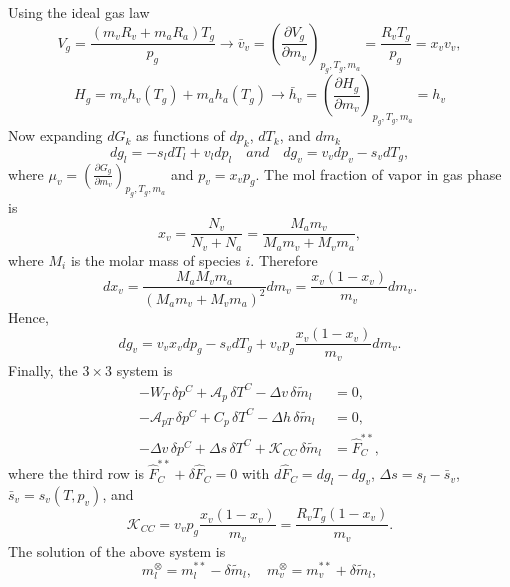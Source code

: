 Using the ideal gas law
\begin{equation}
V_g = \frac{(m_vR_v+m_aR_a)T_g}{p_g} \rightarrow \bar{v}_v = \left( \frac{\partial V_g}{\partial m_v} \right)_{p_g,T_g,m_a} = \frac{R_vT_g}{p_g} = x_v v_v,
\end{equation}
\begin{equation}
H_g = m_v h_v(T_g) + m_a h_a(T_g) \rightarrow \bar{h}_v = \left( \frac{\partial H_g}{\partial m_v} \right)_{p_g,T_g,m_a} = h_v
\end{equation}
Now expanding $dG_k$ as functions of $dp_k$, $dT_k$, and $dm_k$
\begin{equation}
dg_l = -s_l dT_l + v_l dp_l \quad and \quad dg_v = v_v dp_v - s_v dT_g,
\end{equation}
where $\mu_v = \left( \frac{\partial G_g}{\partial m_v} \right)_{p_g,T_g,m_a}$ and $p_v=x_vp_g$.
The mol fraction of vapor in gas phase is
\begin{equation}
x_v = \frac{N_v}{N_v+N_a} = \frac{M_a m_v}{M_a m_v + M_v m_a},
\end{equation}
where $M_i$ is the molar mass of species $i$. Therefore
\begin{equation}
dx_v = \frac{M_a M_v m_a}{(M_a m_v + M_v m_a)^2} dm_v = \frac{x_v (1-x_v)}{m_v} dm_v.
\end{equation}
Hence,
\begin{equation}
dg_v = v_v x_v dp_g - s_v dT_g + v_v p_g \frac{x_v (1-x_v)}{m_v} dm_v.
\end{equation}
Finally, the $3 \times 3$ system is
\begin{align}
- W_T \,\delta p^C + \mathcal{A}_p \,\delta T^C - \Delta v \,\delta\tilde{m}_l &= 0,\\
- \mathcal{A}_{pT} \,\delta p^C + C_p \,\delta T^C - \Delta h \,\delta\tilde{m}_l &= 0,\\
- \Delta v \,\delta p^C + \Delta s \,\delta T^C + \mathcal{K}_{CC} \,\delta\tilde{m}_l &= \hat{F}_C^{**},
\end{align}
where the third row is $\hat{F}_C^{**}+\delta \hat{F}_C=0$ with $d\hat{F}_C=dg_l-dg_v$, $\Delta s=s_l-\bar s_v$, $\bar s_v=s_v(T,p_v)$, and
\begin{equation}
\mathcal{K}_{CC} = v_v p_g \frac{x_v (1-x_v)}{m_v} = \frac{R_v T_g (1-x_v)}{m_v}.
\end{equation}
The solution of the above system is
\begin{equation}
m_l^{\otimes} = m_l^{**} - \delta\tilde{m}_l, \quad m_v^{\otimes} = m_v^{**} + \delta\tilde{m}_l,
\end{equation}
